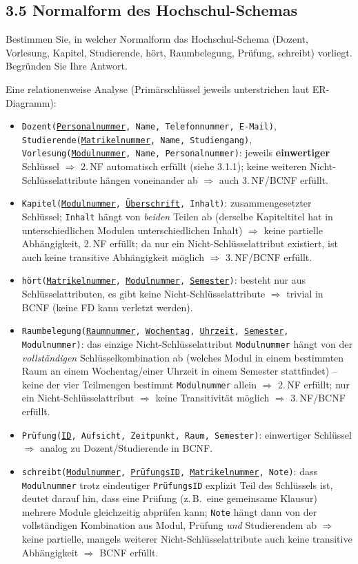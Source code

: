 \documentclass[11pt,a4paper]{article}
\newcommand{\pk}[1]{\underline{#1}}
\begin{document}
\subsection*{3.5 \quad Normalform des Hochschul-Schemas}
Bestimmen Sie, in welcher Normalform das Hochschul-Schema (Dozent, Vorlesung, Kapitel, Studierende, h\"ort, Raumbelegung, Pr\"ufung, schreibt) vorliegt. Begr\"unden Sie Ihre Antwort.

\begin{loesung}
Eine relationenweise Analyse (Prim\"arschl\"ussel jeweils unterstrichen laut ER-Diagramm):

\begin{itemize}
\item \texttt{Dozent(\pk{Personalnummer}, Name, Telefonnummer, E-Mail)}, \texttt{Studierende(\pk{Matrikelnummer}, Name, Studiengang)}, \texttt{Vorlesung(\pk{Modulnummer}, Name, Personalnummer)}: jeweils \textbf{einwertiger} Schl\"ussel $\Rightarrow$ 2.\,NF automatisch erf\"ullt (siehe 3.1.1); keine weiteren Nicht-Schl\"usselattribute h\"angen voneinander ab $\Rightarrow$ auch 3.\,NF/BCNF erf\"ullt.
\item \texttt{Kapitel(\pk{Modulnummer}, \pk{\"Uberschrift}, Inhalt)}: zusammengesetzter Schl\"ussel; \texttt{Inhalt} h\"angt von \emph{beiden} Teilen ab (derselbe Kapiteltitel hat in unterschiedlichen Modulen unterschiedlichen Inhalt) $\Rightarrow$ keine partielle Abh\"angigkeit, 2.\,NF erf\"ullt; da nur ein Nicht-Schl\"usselattribut existiert, ist auch keine transitive Abh\"angigkeit m\"oglich $\Rightarrow$ 3.\,NF/BCNF erf\"ullt.
\item \texttt{h\"ort(\pk{Matrikelnummer}, \pk{Modulnummer}, \pk{Semester})}: besteht nur aus Schl\"usselattributen, es gibt keine Nicht-Schl\"usselattribute $\Rightarrow$ trivial in BCNF (keine FD kann verletzt werden).
\item \texttt{Raumbelegung(\pk{Raumnummer}, \pk{Wochentag}, \pk{Uhrzeit}, \pk{Semester}, Modulnummer)}: das einzige Nicht-Schl\"usselattribut \texttt{Modulnummer} h\"angt von der \emph{vollst\"andigen} Schl\"usselkombination ab (welches Modul in einem bestimmten Raum an einem Wochentag/einer Uhrzeit in einem Semester stattfindet) -- keine der vier Teilmengen bestimmt \texttt{Modulnummer} allein $\Rightarrow$ 2.\,NF erf\"ullt; nur ein Nicht-Schl\"usselattribut $\Rightarrow$ keine Transitivit\"at m\"oglich $\Rightarrow$ 3.\,NF/BCNF erf\"ullt.
\item \texttt{Pr\"ufung(\pk{ID}, Aufsicht, Zeitpunkt, Raum, Semester)}: einwertiger Schl\"ussel $\Rightarrow$ analog zu Dozent/Studierende in BCNF.
\item \texttt{schreibt(\pk{Modulnummer}, \pk{Pr\"ufungsID}, \pk{Matrikelnummer}, Note)}: dass \texttt{Modulnummer} trotz eindeutiger \texttt{Pr\"ufungsID} explizit Teil des Schl\"ussels ist, deutet darauf hin, dass eine Pr\"ufung (z.\,B.\ eine gemeinsame Klausur) mehrere Module gleichzeitig abpr\"ufen kann; \texttt{Note} h\"angt dann von der vollst\"andigen Kombination aus Modul, Pr\"ufung \emph{und} Studierendem ab $\Rightarrow$ keine partielle, mangels weiterer Nicht-Schl\"usselattribute auch keine transitive Abh\"angigkeit $\Rightarrow$ BCNF erf\"ullt.
\end{itemize}


\end{loesung}
\end{document}
